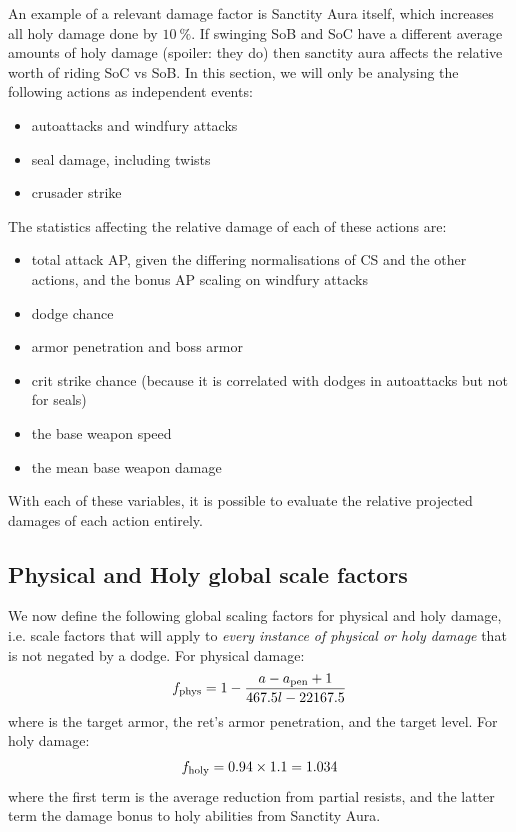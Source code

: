 An example of a relevant damage factor is Sanctity Aura itself, which increases all holy damage done by $10~\%$.
If swinging SoB and SoC have a different average amounts of holy damage (spoiler: they do) then sanctity aura affects the relative worth of riding SoC vs SoB.
In this section, we will only be analysing the following actions as independent events:
\begin{itemize}
	\item autoattacks and windfury attacks
	\item seal damage, including twists
	\item crusader strike
\end{itemize}
The statistics affecting the relative damage of each of these actions are:
\begin{itemize}
	\item total attack AP, given the differing normalisations of CS and the other actions, and the bonus AP scaling on windfury attacks
	\item dodge chance
	\item armor penetration and boss armor
	\item crit strike chance (because it is correlated with dodges in autoattacks but not for seals)
	\item the base weapon speed
	\item the mean base weapon damage
\end{itemize}
With each of these variables, it is possible to evaluate the relative projected damages of each action entirely.

\subsection{Physical and Holy global scale factors}
We now define the following global scaling factors for physical and holy damage, i.e. scale factors that will apply to \emph{every instance of physical or holy damage} that is not negated by a dodge.
For physical damage:
\begin{equation}
	f_{\mathrm{phys}}  = 1 - \frac{a - a_\mathrm{pen} + 1}{467.5 l -22167.5}
\end{equation}
where \armor is the target armor, \armpen the ret's armor penetration, and \lvl the target level.
\noindent
For holy damage:
\begin{equation}
	f_{\mathrm{holy}}  = 0.94 \times 1.1 = 1.034
\end{equation}
where the first term is the average reduction from partial resists, and the latter term the damage bonus to holy abilities from Sanctity Aura.


